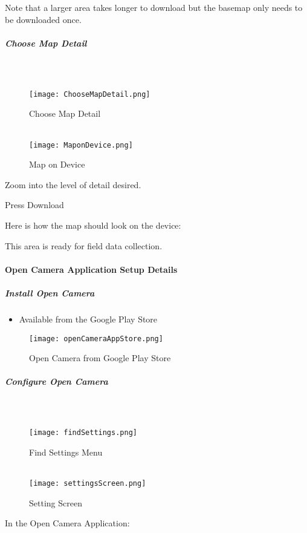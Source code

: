 \documentclass[class=article , crop=false, titlepage, twoside, multi={itemize, figure, verbatim}, float=false]{standalone}
\begin{document}
\noindent \footnotesize Note that a larger area takes longer to download but the basemap only needs to be downloaded once.
\clearpage
\subparagraph{Choose Map Detail}

\subparagraph*{\\}
\begin{wrapfigure}{r}{0.5\textwidth}
\centering
\texttt{[image: ChooseMapDetail.png]}
\caption{Choose Map Detail}
\vspace{.25in}
\HRule \\[.4cm] %
\vspace{.25in}
\texttt{[image: MaponDevice.png]}
\caption{Map on Device}
\end{wrapfigure}
Zoom into the level of detail desired.
\vspace{.5in}

\noindent Press Download \\
\vspace{3in}

\noindent Here is how the map should look on the device:\\
\vspace{1in}

\noindent This area is ready for field data collection.

\clearpage
\paragraph{Open Camera Application Setup Details}

\subparagraph{Install Open Camera}
\begin{itemize}
\item Available from the Google Play Store
\end{itemize}
\begin{figure}[h!]
\centering
    \texttt{[image: openCameraAppStore.png]}
\caption{Open Camera from Google Play Store}
\end{figure}

\clearpage
\subparagraph{Configure Open Camera}

\subparagraph*{\\}
\begin{wrapfigure}{r}{0.5\textwidth}
\centering
\texttt{[image: findSettings.png]}
\caption{Find Settings Menu}
\vspace{.25in}
\HRule \\[.4cm] %
\vspace{.25in}
\texttt{[image: settingsScreen.png]}
\caption{Setting Screen}
\end{wrapfigure}
In the Open Camera Application:\\
\vspace{1in}
\end{document}
